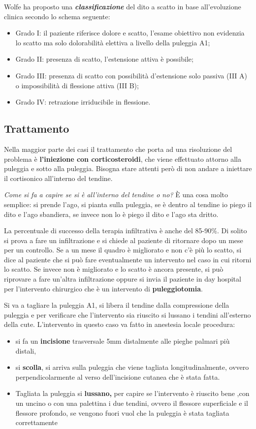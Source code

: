 Wolfe ha proposto una \textbf{\emph{classificazione}} del dito a scatto
in base all'evoluzione clinica secondo lo schema seguente:
\begin{itemize}
\item Grado I: il paziente riferisce dolore e scatto, l'esame obiettivo non evidenzia lo scatto ma solo dolorabilità elettiva a livello della puleggia A1;
\item Grado II: presenza di scatto, l'estensione attiva è possibile;
\item Grado III: presenza di scatto con possibilità d'estensione solo passiva (III A) o impossibilità di
flessione attiva (III B);
\item Grado IV: retrazione irriducibile in flessione.
\end{itemize}

\subsection{Trattamento}

Nella maggior parte dei casi il trattamento che porta ad una risoluzione del problema è \textbf{l'iniezione con corticosteroidi}, che viene
effettuato attorno alla puleggia e sotto alla puleggia. Bisogna stare attenti però di non andare a iniettare il cortisonico all'interno del tendine.

\emph{Come si fa a capire se si è all'interno del tendine o no?} È una cosa molto semplice: si prende l'ago, si pianta sulla puleggia, se è dentro al tendine io piego il dito e l'ago sbandiera, se invece non lo è piego il dito e l'ago sta dritto.

La percentuale di successo della terapia infiltrativa è anche del 85-90\%. Di solito si prova a fare un infiltrazione e si chiede al paziente di ritornare dopo un mese per un controllo. Se a un mese il quadro è migliorato e non c'è più lo scatto, si dice al paziente che si può fare eventualmente un intervento nel caso in cui ritorni lo scatto.
Se invece non è migliorato e lo scatto è ancora presente, si può riprovare a fare un'altra infiltrazione oppure si invia il paziente in
day hospital per l'intervento chirurgico che è un intervento di \textbf{puleggiotomia}.

Si va a tagliare la puleggia A1, si libera il tendine dalla compressione della puleggia e per verificare che l'intervento sia riuscito si lussano
i tendini all'esterno della cute. L'intervento in questo caso va fatto in anestesia locale procedura:

\begin{itemize}
\item
  si fa un \textbf{incisione} trasversale 5mm distalmente alle pieghe palmari più distali,
\item
  si \textbf{scolla}, si arriva sulla puleggia che viene tagliata longitudinalmente, ovvero perpendicolarmente al verso dell'incisione cutanea che è stata fatta.
\item
  Tagliata la puleggia si \textbf{lussano,} per capire se l'intervento è riuscito bene ,con un uncino o con una palettina i due tendini, ovvero il flessore superficiale e il flessore profondo, se vengono fuori vuol che la puleggia è stata tagliata correttamente
\end{itemize}

